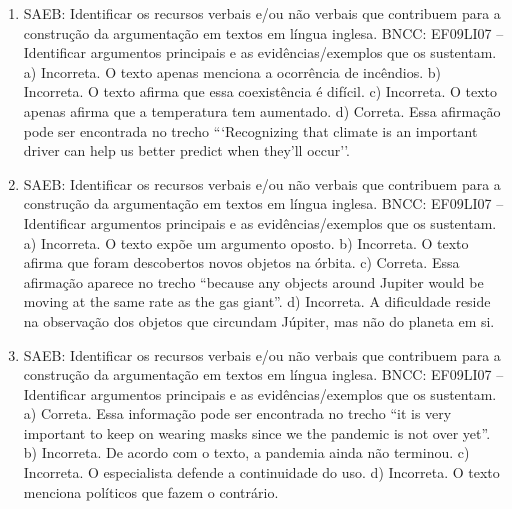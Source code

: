 \begin{enumerate}
\item
SAEB: Identificar os recursos verbais e/ou não verbais que contribuem
para a construção da argumentação em textos em língua inglesa.
BNCC: EF09LI07 -- Identificar argumentos principais e as
evidências/exemplos que os sustentam.
a) Incorreta. O texto apenas menciona a ocorrência de incêndios.
b) Incorreta. O texto afirma que essa coexistência é difícil.
c) Incorreta. O texto apenas afirma que a temperatura tem aumentado.
d) Correta. Essa afirmação pode ser encontrada no trecho ```Recognizing
that climate is an important driver can help us better predict when
they'll occur''.

\item
SAEB: Identificar os recursos verbais e/ou não verbais que contribuem
para a construção da argumentação em textos em língua inglesa.
BNCC: EF09LI07 -- Identificar argumentos principais e as
evidências/exemplos que os sustentam.
a) Incorreta. O texto expõe um argumento oposto.
b) Incorreta. O texto afirma que foram descobertos novos objetos na
órbita.
c) Correta. Essa afirmação aparece no trecho ``because
any objects around Jupiter would be moving at the same rate as the gas
giant''.
d) Incorreta. A dificuldade reside na observação dos objetos que
circundam Júpiter, mas não do planeta em si.

\item
SAEB: Identificar os recursos verbais e/ou não verbais que contribuem
para a construção da argumentação em textos em língua inglesa.
BNCC: EF09LI07 -- Identificar argumentos principais e as
evidências/exemplos que os sustentam.
a) Correta. Essa informação pode ser encontrada no trecho ``it is very important to keep on wearing masks since we the pandemic is not over yet''.
b) Incorreta. De acordo com o texto, a pandemia ainda não terminou.
c) Incorreta. O especialista defende a continuidade do uso.
d) Incorreta. O texto menciona políticos que fazem o contrário.
\end{enumerate}


